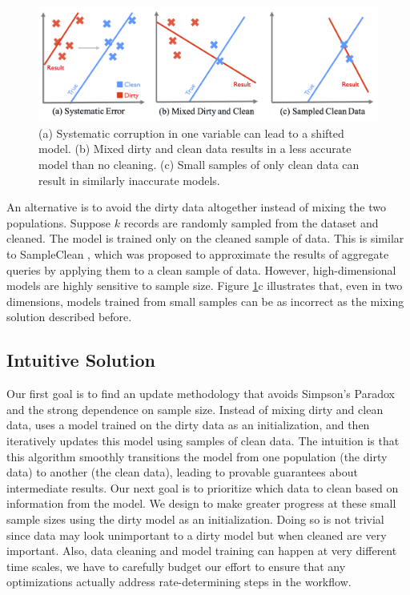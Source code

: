 \begin{figure}[ht!]
\centering
 \includegraphics[width=\columnwidth]{figs/update-arch.png}
 \caption{(a) Systematic corruption in one variable can lead to a shifted model. 
 (b) Mixed dirty and clean data results in a less accurate model than no cleaning.
(c) Small samples of only clean data can result in similarly inaccurate models. \label{update-arch1}}
\end{figure}

An alternative is to avoid the dirty data altogether instead of mixing the two populations.
Suppose $k$ records are randomly sampled from the dataset and cleaned.
The model is trained only on the cleaned sample of data.
This is similar to SampleClean \cite{wang1999sample}, which was proposed to approximate the results of aggregate queries by applying them to a clean sample of data.
However, high-dimensional models are highly sensitive to sample size.
Figure \ref{update-arch1}c illustrates that, even in two dimensions, models trained from small samples can be as incorrect as the mixing solution described before.

\subsection{Intuitive Solution}
Our first goal is to find an update methodology that avoids Simpson's Paradox and the strong dependence on sample size.
Instead of mixing dirty and clean data, \sys uses a model trained on the dirty data as an initialization, and then iteratively updates this model using samples of clean data.
The intuition is that this algorithm smoothly transitions the model from one population (the dirty data) to another (the clean data), leading to provable guarantees about intermediate results.
Our next goal is to prioritize which data to clean based on information from the model.
We design \sys to make greater progress at these small sample sizes using the dirty model as an initialization.
Doing so is not trivial since data may look unimportant to a dirty model but when cleaned are very important.
Also, data cleaning and model training can happen at very different time scales, we have to carefully budget our effort to ensure that any optimizations actually address rate-determining steps in the workflow.

